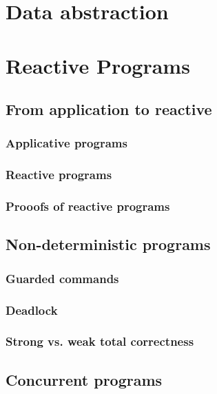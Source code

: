 \documentclass[12pt, a4paper]{book}
\begin{document}
  \section{Data abstraction}
  \label{sec:Data abstraction}


  \section{Reactive Programs}
  \label{sec:Reactive Programs}
  \subsection{From application to reactive}
  \label{sub:From application to reactive}
  \subsubsection{Applicative programs}
  \label{subs:Applicative programs}
  \subsubsection{Reactive programs}
  \label{subs:Reactive programs}
  \subsubsection{Prooofs of reactive programs}
  \label{subs:Prooofs of reactive programs}
  \subsection{Non-deterministic programs}
  \label{sub:Non-deterministic programs}
  \subsubsection{Guarded commands}
  \label{subs:Guarded commands}
  \subsubsection{Deadlock}
  \label{subs:Deadlock}
  \subsubsection{Strong vs. weak total correctness}
  \label{subs:Strong vs. weak total correctness}
  \subsection{Concurrent programs}
  \label{sub:Concurrent programs}
\end{document}
